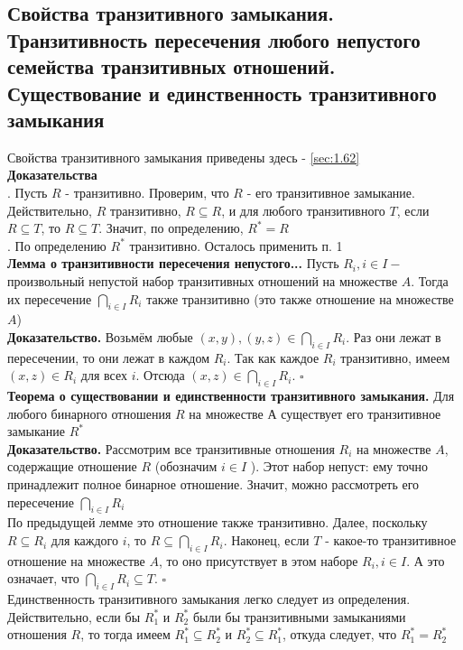 \documentclass[a4paper]{article}
\newcommand{\qed}{\hfill$\square$}
\begin{document}
\subsection{Свойства транзитивного замыкания. Транзитивность пересечения любого непустого семейства транзитивных отношений. Существование и единственность транзитивного замыкания}
Свойства транзитивного замыкания приведены здесь - \ref{sec:1.62}\\[2mm]
\indent\textbf{Доказательства}\\[2mm]
. Пусть $R$ - транзитивно. Проверим, что $R$ - его транзитивное замыкание. Действительно, $R$ транзитивно, $R \subseteq R$, и для любого транзитивного $T$, если $R \subseteq T$, то $R \subseteq T$. Значит, по определению, $R^{*}=R$\\[2mm]
. По определению $R^{*}$ транзитивно. Осталось применить п. 1\\[2mm]
\indent\textbf{Лемма о транзитивности пересечения непустого...} Пусть $R_{i}, i \in I-$ произвольный непустой набор транзитивных отношений на множестве $A$. Тогда их пересечение $\bigcap_{i \in I} R_{i}$ также транзитивно (это также отношение на множестве $A$)\\[2mm]
\indent\textbf{Доказательство.} Возьмём любые $(x, y),(y, z) \in \bigcap_{i \in I} R_{i}$. Раз они лежат в пересечении, то они лежат в каждом $R_{i}$. Так как каждое $R_{i}$ транзитивно, имеем $(x, z) \in R_{i}$ для всех $i$. Отсюда $(x, z) \in \bigcap_{i \in I} R_{i}$. \qed\\[2mm]
\indent\textbf{Теорема о существовании и единственности транзитивного замыкания.} Для любого бинарного отношения $R$ на множестве А существует его транзитивное замыкание $R^{*}$\\[2mm]
\indent\textbf{Доказательство.} Рассмотрим все транзитивные отношения $R_{i}$ на множестве $A$, содержащие отношение $R$ (обозначим $i \in I$ ). Этот набор непуст: ему точно принадлежит полное бинарное отношение. Значит, можно рассмотреть его пересечение $\bigcap_{i \in I} R_{i}$\\[2mm]
\indent По предыдущей лемме это отношение также транзитивно. Далее, поскольку $R \subseteq R_{i}$ для каждого $i$, то $R \subseteq \bigcap_{i \in I} R_{i}$. Наконец, если $T$ - какое-то транзитивное отношение на множестве $A$, то оно присутствует в этом наборе $R_{i}, i \in I$. А это означает, что $\bigcap_{i \in I} R_{i} \subseteq T$. \qed\\[2mm]
\indent Единственность транзитивного замыкания легко следует из определения. Действительно, если бы $R_{1}^{*}$ и $R_{2}^{*}$ были бы транзитивными замыканиями отношения $R$, то тогда имеем $R_{1}^{*} \subseteq R_{2}^{*}$ и $R_{2}^{*} \subseteq R_{1}^{*}$, откуда следует, что $R_{1}^{*}=R_{2}^{*}$
\end{document}
